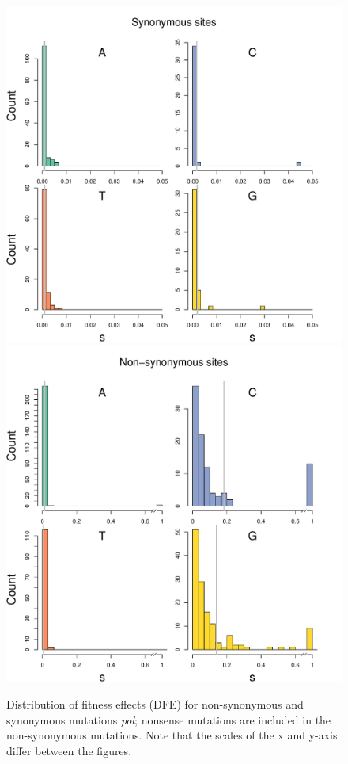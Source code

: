 \documentclass{article}
\begin{document}
\begin{figure}[ht!]
\centering
\includegraphics[scale = .45]{F3-Bacheler-syn.pdf}
\includegraphics[scale = .45]{F3-Bacheler-nonsyn.pdf}
\caption{Distribution of fitness effects (DFE) for non-synonymous and synonymous mutations \textit {pol}; nonsense mutations are included in the non-synonymous mutations. Note that the scales of the x and y-axis differ between the figures.}
\label{Bachelernonsyn}
\end{figure}
\end{document}
